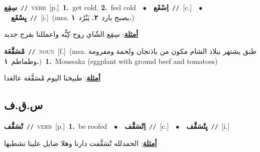 \documentclass[10pt,a4paper,twoside]{article} %
\begin{document}
\begin{multicols}{2}
{\setlength\topsep{0pt}\textbf{\foreignlanguage{arabic}{سِقِع}}\ {\color{gray}\texttt{//}\color{black}}\ \textsc{verb}\ [p.]\ \textbf{1.}~get cold.  \textbf{2.}~feel cold\ \ $\bullet$\ \ \setlength\topsep{0pt}\textbf{\foreignlanguage{arabic}{اِسْقَع}}\ {\color{gray}\texttt{//}\color{black}}\ [c.]\ \ $\bullet$\ \ \setlength\topsep{0pt}\textbf{\foreignlanguage{arabic}{يِسْقَع}}\ {\color{gray}\texttt{//}\color{black}}\ [i.]\ \color{gray}(msa. \foreignlanguage{arabic}{يصبح بارد}~\foreignlanguage{arabic}{\textbf{٢.}}  \foreignlanguage{arabic}{يَبْرُد}~\foreignlanguage{arabic}{\textbf{١.}})\color{black}\  \begin{flushright}\color{gray}\foreignlanguage{arabic}{\textbf{\underline{\foreignlanguage{arabic}{أمثلة}}}: سِقِع الشّاي روح كِبُّه واعمللنا بقرج جديد}\end{flushright}\color{black}} \vspace{2mm}

{\setlength\topsep{0pt}\textbf{\foreignlanguage{arabic}{مْسَقَّعَة}}\ {\color{gray}\texttt{//}\color{black}}\ \textsc{noun}\ [f.]\ \color{gray}(msa. \foreignlanguage{arabic}{طبق يشتهر ببلاد الشام مكون من باذنجان ولحمة ومفرومة وطماطم}~\foreignlanguage{arabic}{\textbf{١.}})\color{black}\ \textbf{1.}~Moussaka (eggplant with ground beef and tomatoes)\  \begin{flushright}\color{gray}\foreignlanguage{arabic}{\textbf{\underline{\foreignlanguage{arabic}{أمثلة}}}: طبيخنا اليوم مْسَقَّعَة عالغدا}\end{flushright}\color{black}} \vspace{2mm}

\vspace{-3mm}
\subsection*{\color{blue}\foreignlanguage{arabic}{س.ق.ف}\color{blue}{}} 

{\setlength\topsep{0pt}\textbf{\foreignlanguage{arabic}{تْسَقَّف}}\ {\color{gray}\texttt{//}\color{black}}\ \textsc{verb}\ [p.]\ \textbf{1.}~be roofed\ \ $\bullet$\ \ \setlength\topsep{0pt}\textbf{\foreignlanguage{arabic}{اِتْسَقَّف}}\ {\color{gray}\texttt{//}\color{black}}\ [c.]\ \ $\bullet$\ \ \setlength\topsep{0pt}\textbf{\foreignlanguage{arabic}{يِتْسَقَّف}}\ {\color{gray}\texttt{//}\color{black}}\ [i.]\  \begin{flushright}\color{gray}\foreignlanguage{arabic}{\textbf{\underline{\foreignlanguage{arabic}{أمثلة}}}: الحمدلله تْسَقَّفت دارنا وهلا ضايل علينا نشطبها}\end{flushright}\color{black}} \vspace{2mm}


\end{multicols}
\end{document}

